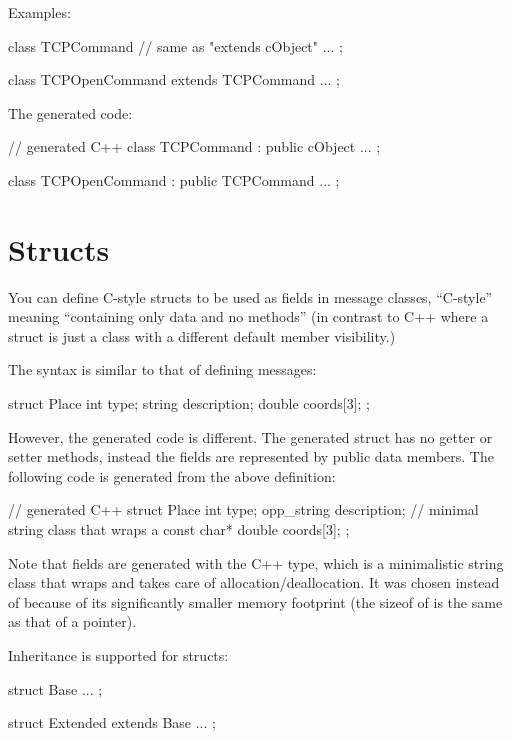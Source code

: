 Examples:

\begin{msg}
class TCPCommand  // same as "extends cObject"
{
    ...
};

class TCPOpenCommand extends TCPCommand
{
    ...
};
\end{msg}

The generated code:

\begin{cpp}
// generated C++
class TCPCommand : public cObject
{
    ...
};

class TCPOpenCommand : public TCPCommand
{
    ...
};
\end{cpp}


\section{Structs}
\label{sec:msg-defs:defining-structs}

You can define C-style structs to be used as fields in message classes,
``C-style'' meaning ``containing only data and no methods'' (in contrast to
C++ where a struct is just a class with a different default member
visibility.)

The syntax is similar to that of defining messages:

\begin{msg}
struct Place
{
    int type;
    string description;
    double coords[3];
};
\end{msg}

However, the generated code is different. The generated struct has
no getter or setter methods, instead the fields are represented
by public data members. The following code is generated from
the above definition:

\begin{cpp}
// generated C++
struct Place
{
    int type;
    opp_string description; // minimal string class that wraps a const char*
    double coords[3];
};
\end{cpp}

Note that  fields are generated with the 
C++ type, which is a minimalistic string class that wraps 
and takes care of allocation/deallocation. It was chosen instead of
 because of its significantly smaller memory footprint
(the sizeof of  is the same as that of a 
pointer).

Inheritance is supported for structs:

\begin{msg}
struct Base
{
    ...
};

struct Extended extends Base
{
    ...
};
\end{msg}

